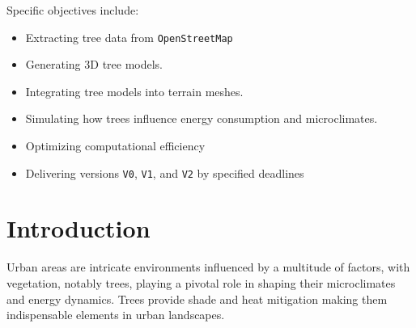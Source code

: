 \documentclass[12pt]{article}
\begin{document}
Specific objectives include:
\begin{itemize}
    \item Extracting tree data from \texttt{OpenStreetMap}
    \item Generating 3D tree models.
    \item Integrating tree models into terrain meshes.
    \item Simulating how trees influence energy consumption and microclimates.
    \item Optimizing computational efficiency
    \item Delivering versions \texttt{V0}, \texttt{V1}, and \texttt{V2} by specified deadlines
\end{itemize}

\section{Introduction}
Urban areas are intricate environments influenced by a multitude of factors, with 
vegetation, notably trees, playing a pivotal role in shaping their microclimates 
and energy dynamics. Trees provide shade and heat mitigation making them
indispensable elements in urban landscapes\cite{TIR4sTREEt,img:TreeShade}.
\end{document}
